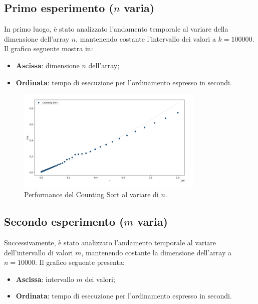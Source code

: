 \documentclass[a4paper, 12pt, oneside]{book}
\begin{document}
\subsection{Primo esperimento ($n$ varia)}

\noindent
In primo luogo, è stato analizzato l'andamento temporale al variare della dimensione dell'array \(n\), mantenendo costante l'intervallo dei valori a \(k = 100000\). 
Il grafico seguente mostra in:
\begin{itemize}
    \item \textbf{Ascissa}: dimensione \(n\) dell'array;
    \item \textbf{Ordinata}: tempo di esecuzione per l'ordinamento espresso in secondi.
\end{itemize}

\begin{figure}[H]
    \centering
    \includegraphics[width=0.8\textwidth]{images/grafico_counting_sort_n.png}
    \caption{Performance del Counting Sort al variare di \(n\).}
    \label{fig:counting_sort_n}
\end{figure}

\subsection{Secondo esperimento ($m$ varia)}

\noindent Successivamente, è stato analizzato l'andamento temporale al variare dell'intervallo di valori \(m\), mantenendo costante la dimensione dell'array a \(n = 10000\). 
Il grafico seguente presenta:
\begin{itemize}
    \item \textbf{Ascissa}: intervallo \(m\) dei valori;
    \item \textbf{Ordinata}: tempo di esecuzione per l'ordinamento espresso in secondi.
\end{itemize}
\end{document}
